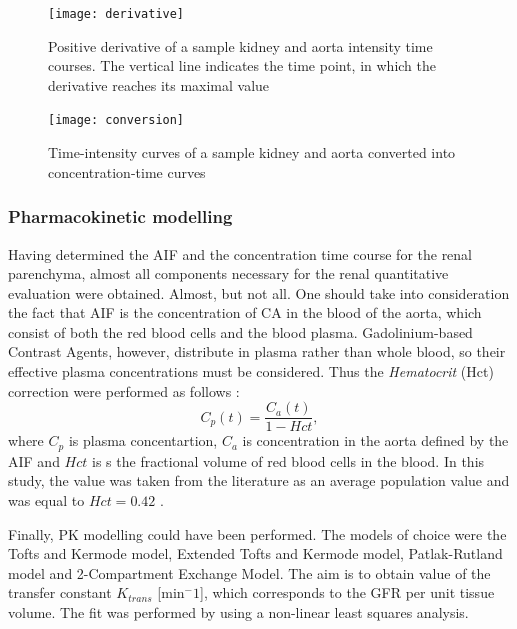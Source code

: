\begin{figure}[H]
	\centering
	\texttt{[image: derivative]}
\caption[Positive derivative of the sample kidney and aorta intensity time courses]{Positive derivative of a sample kidney and aorta intensity time courses. The vertical line indicates the time point, in which the derivative reaches its maximal value}
\label{fig:derivative}
\end{figure}

\begin{figure}[H]
	\centering
	\texttt{[image: conversion]}
\caption[Time courses of a sample kidney and aorta after intensity-concentration conversion]{Time-intensity curves of a sample kidney and aorta converted into concentration-time curves}
\label{fig:conversion}
\end{figure}


\subsubsection{Pharmacokinetic modelling}

Having determined the AIF and the concentration time course for the renal pa\-ren\-chy\-ma, almost all components necessary for the renal quantitative evaluation were obtained. Almost, but not all. One should take into consideration the fact that AIF is the concentration of CA in the blood of the aorta, which consist of both the red blood cells and the blood plasma. Gadolinium-based Contrast Agents, however, distribute in plasma rather than whole blood, so their effective plasma concentrations must be considered. Thus the \textit{Hematocrit} (Hct) correction were performed as follows \cite{tofts2010t1}:
\begin{equation}
	\label{eq:hematocrit}
	C_{p}(t) = \frac{C_{a}(t)} {1-Hct},
\end{equation}
where $C_p$ is plasma concentartion, $C_a$ is concentration in the aorta defined by the AIF and $Hct$ is s the fractional volume of red blood cells in the blood. In this study, the value was taken from the literature as an average population value and was equal to $Hct=0.42$ \cite{tofts2010t1}.

Finally, PK modelling could have been performed. The models of choice were the Tofts and Kermode model, Extended Tofts and Kermode model, Patlak-Rutland model and 2-Compartment Exchange Model. The aim is to obtain value of the transfer constant $K_{trans}$ [min$^-1$], which corresponds to the GFR per unit tissue volume. The fit was performed by using a non-linear least squares analysis.
 
